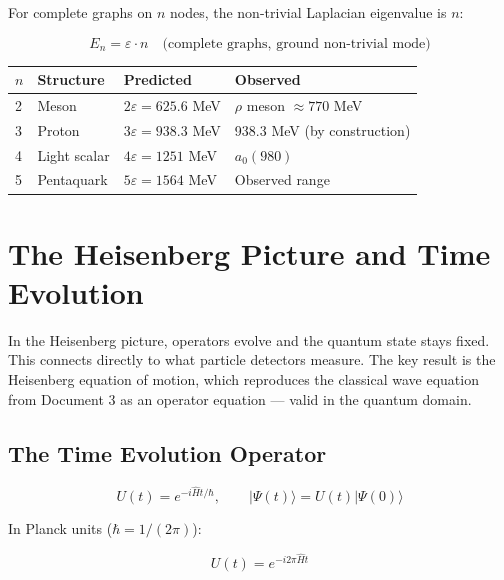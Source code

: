\documentclass[11pt,letterpaper]{article}
\newenvironment{plainbox}{\begin{tcolorbox}[colback=blue!3!white,colframe=blue!40!white,title={\small\textit{In plain language}},breakable]}{\end{tcolorbox}}
\begin{document}
For complete graphs on \(n\) nodes, the non-trivial Laplacian eigenvalue is \(n\):

\begin{equation}
E_n = \varepsilon \cdot n \quad \text{(complete graphs, ground non-trivial mode)}
\end{equation}

\begin{center}
\begin{tabular}{llll}
\toprule
\(n\) & \textbf{Structure} & \textbf{Predicted} & \textbf{Observed}\\[0pt]
\midrule
2 & Meson & \(2\varepsilon = 625.6\) MeV & \(\rho\) meson \(\approx 770\) MeV\\[0pt]
3 & Proton & \(3\varepsilon = 938.3\) MeV & 938.3 MeV (by construction)\\[0pt]
4 & Light scalar & \(4\varepsilon = 1251\) MeV & \(a_0(980)\)\\[0pt]
5 & Pentaquark & \(5\varepsilon = 1564\) MeV & Observed range\\[0pt]
\bottomrule
\end{tabular}
\end{center}

\section{The Heisenberg Picture and Time Evolution}
\label{sec:org4c0d660}

\begin{plainbox}
In the Heisenberg picture, operators evolve and the quantum state stays fixed. This connects directly to what particle detectors measure. The key result is the Heisenberg equation of motion, which reproduces the classical wave equation from Document 3 as an operator equation --- valid in the quantum domain.
\end{plainbox}

\subsection{The Time Evolution Operator}
\label{sec:org4acaf33}

\begin{equation}
U(t) = e^{-i\hat{H}t/\hbar}, \qquad |\Psi(t)\rangle = U(t)|\Psi(0)\rangle
\end{equation}

In Planck units (\(\hbar = 1/(2\pi)\)):

\begin{equation}
U(t) = e^{-i2\pi\hat{H}t}
\end{equation}
\end{document}

